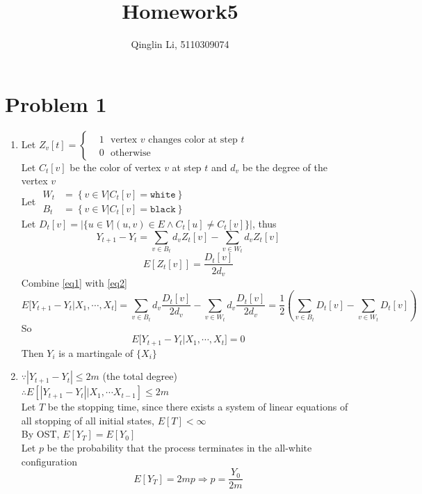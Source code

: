 \documentclass[12pt]{article}
\date{}
\title{Homework5}
\author{Qinglin Li, 5110309074}
\begin{document}
\maketitle

\section*{Problem 1}
\begin{enumerate}
\item
Let 
$
Z_v[t]=\left\{
\begin{aligned}
&1~~~\text{vertex }v\text{ changes color at step }t\\
&0~~~\text{otherwise}
\end{aligned}
\right.
$\\
Let $C_t[v]$ be the color of vertex $v$ at step $t$ and $d_v$ be the degree of the vertex $v$\\

Let 
$
\begin{aligned}
W_t&=\left\{v\in V|C_t[v]=\texttt{white}\right\}\\
B_t&=\left\{v\in V|C_t[v]=\texttt{black}\right\}
\end{aligned}
$\\
Let $D_t[v]=\Big|\{u\in V|(u,v)\in E\wedge C_t[u]\neq C_t[v]\}\Big|$, thus
\begin{equation}\label{eq1}
Y_{t+1}-Y_{t}=\sum_{v\in B_t}d_vZ_t[v]-\sum_{v\in W_t}d_vZ_t[v]
\end{equation}
\begin{equation}\label{eq2}
E\left[Z_t[v]\right]=\dfrac{D_t[v]}{2d_v}
\end{equation}
Combine \eqref{eq1} with \eqref{eq2}
$$E\big[Y_{t+1}-Y_t|X_1,\cdots,X_t\big]=\sum_{v\in B_t}d_v\dfrac{D_t[v]}{2d_v}-\sum_{v\in W_t}d_v\dfrac{D_t[v]}{2d_v}=\dfrac{1}{2}\left({\sum_{v\in B_t}D_t[v]-\sum_{v\in W_t}D_t[v]}\right)$$
So
$$E\big[Y_{t+1}-Y_t|X_1,\cdots,X_t\big]=0$$
Then $Y_i$ is a martingale of $\{X_i\}$
\item
$\because |Y_{t+1}-Y_t|\leq 2m$  (the total degree)\\
$\therefore E\left[|Y_{t+1}-Y_t|\big|X_1,\cdots X_{t-1}\right]\leq 2m$\\
Let $T$ be the stopping time, since there exists a system of linear equations of all stopping of all initial states, $E[T]<\infty$\\
By OST, $E[Y_T]=E[Y_0]$\\ 
Let $p$ be the  probability that the process terminates in the all-white configuration\\
$$E[Y_T]=2mp\Rightarrow p=\dfrac{Y_0}{2m}$$
\end{enumerate}
\end{document}
